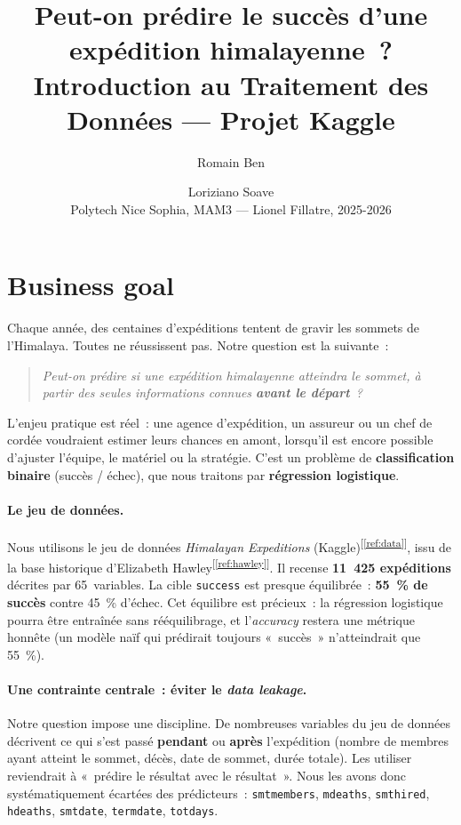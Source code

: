 \documentclass[11pt,a4paper]{article}
\title{\vspace{-1.5cm}\textbf{Peut-on prédire le succès d'une expédition himalayenne~?}\\[0.3cm]
\large Introduction au Traitement des Données --- Projet Kaggle}
\author{Romain Ben \and Loriziano Soave \\[0.2cm]
\small Polytech Nice Sophia, MAM3 --- Lionel Fillatre, 2025-2026}
\date{}
\newcommand{\refcite}[1]{\textsuperscript{\textcolor{refblue}{[\ref{#1}]}}}
\begin{document}
\maketitle
\vspace{-0.8cm}

\section{Business goal}

Chaque année, des centaines d'expéditions tentent de gravir les sommets de
l'Himalaya. Toutes ne réussissent pas. Notre question est la suivante~:

\begin{quote}
\itshape Peut-on prédire si une expédition himalayenne atteindra le sommet,
à partir des seules informations connues \textbf{avant le départ}~?
\end{quote}

L'enjeu pratique est réel~: une agence d'expédition, un assureur ou un chef
de cordée voudraient estimer leurs chances en amont, lorsqu'il est encore
possible d'ajuster l'équipe, le matériel ou la stratégie. C'est un problème
de \textbf{classification binaire} (succès / échec), que nous traitons par
\textbf{régression logistique}.

\paragraph{Le jeu de données.} Nous utilisons le jeu de données
\textit{Himalayan Expeditions} (Kaggle)\refcite{ref:data}, issu de la base
historique d'Elizabeth Hawley\refcite{ref:hawley}. Il recense
\textbf{11~425 expéditions} décrites par
65~variables. La cible \texttt{success} est presque équilibrée~:
\textbf{55~\% de succès} contre 45~\% d'échec. Cet équilibre est précieux~:
la régression logistique pourra être entraînée sans rééquilibrage, et
l'\textit{accuracy} restera une métrique honnête (un modèle naïf qui
prédirait toujours «~succès~» n'atteindrait que 55~\%).

\paragraph{Une contrainte centrale~: éviter le \textit{data leakage}.} Notre
question impose une discipline. De nombreuses variables du jeu de données
décrivent ce qui s'est passé \textbf{pendant} ou \textbf{après} l'expédition
(nombre de membres ayant atteint le sommet, décès, date de sommet, durée
totale). Les utiliser reviendrait à «~prédire le résultat avec le
résultat~». Nous les avons donc systématiquement écartées des prédicteurs~:
\texttt{smtmembers}, \texttt{mdeaths}, \texttt{smthired}, \texttt{hdeaths},
\texttt{smtdate}, \texttt{termdate}, \texttt{totdays}.
\end{document}

